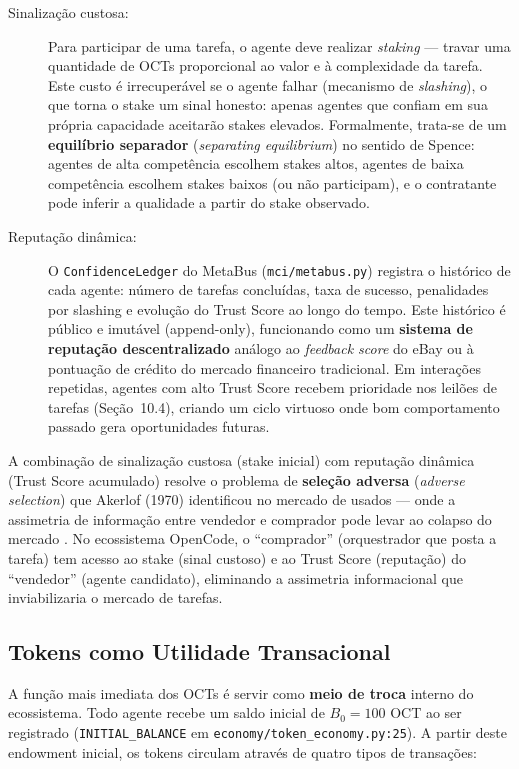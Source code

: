 \begin{description}
    \item[Sinalização custosa:] Para participar de uma tarefa, o agente deve realizar \textit{staking} --- travar uma quantidade de OCTs proporcional ao valor e à complexidade da tarefa. Este custo é irrecuperável se o agente falhar (mecanismo de \textit{slashing}), o que torna o stake um sinal honesto: apenas agentes que confiam em sua própria capacidade aceitarão stakes elevados. Formalmente, trata-se de um \textbf{equilíbrio separador} (\textit{separating equilibrium}) no sentido de Spence: agentes de alta competência escolhem stakes altos, agentes de baixa competência escolhem stakes baixos (ou não participam), e o contratante pode inferir a qualidade a partir do stake observado.
    
    \item[Reputação dinâmica:] O \texttt{ConfidenceLedger} do MetaBus (\texttt{mci/metabus.py}) registra o histórico de cada agente: número de tarefas concluídas, taxa de sucesso, penalidades por slashing e evolução do Trust Score ao longo do tempo. Este histórico é público e imutável (append-only), funcionando como um \textbf{sistema de reputação descentralizado} análogo ao \textit{feedback score} do eBay ou à pontuação de crédito do mercado financeiro tradicional. Em interações repetidas, agentes com alto Trust Score recebem prioridade nos leilões de tarefas (Seção~10.4), criando um ciclo virtuoso onde bom comportamento passado gera oportunidades futuras.
\end{description}

A combinação de sinalização custosa (stake inicial) com reputação dinâmica (Trust Score acumulado) resolve o problema de \textbf{seleção adversa} (\textit{adverse selection}) que Akerlof (1970) identificou no mercado de usados --- onde a assimetria de informação entre vendedor e comprador pode levar ao colapso do mercado \cite{akerlof1970market}. No ecossistema OpenCode, o ``comprador'' (orquestrador que posta a tarefa) tem acesso ao stake (sinal custoso) e ao Trust Score (reputação) do ``vendedor'' (agente candidato), eliminando a assimetria informacional que inviabilizaria o mercado de tarefas.

\subsection{Tokens como Utilidade Transacional}

A função mais imediata dos OCTs é servir como \textbf{meio de troca} interno do ecossistema. Todo agente recebe um saldo inicial de $B_0 = 100$ OCT ao ser registrado (\texttt{INITIAL\_BALANCE} em \texttt{economy/token\_economy.py:25}). A partir deste endowment inicial, os tokens circulam através de quatro tipos de transações:

